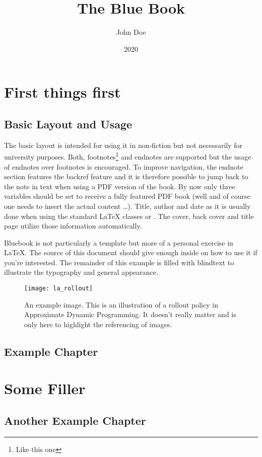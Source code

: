 \documentclass[english]{tex/bluebook}
\title{The Blue Book}
\author{John Doe}
\date{2020}
\begin{document}
	\maketitle	
	\frontmatter
	\tableofcontents

	\mainmatter
	\part{First things first}
	\chapter{Basic Layout and Usage}
	The basic layout is intended for using it in non-fiction but not necessarily for university purposes. 
	Both, footnotes\footnote{Like this one} and endnotes are supported but the usage of endnotes over footnotes is encouraged. To improve navigation, the endnote section features the backref feature and it is therefore possible to jump back to the note in text when using a PDF version of the book. 	 
	By now only three variables should be set to receive a fully featured PDF book (well and of course one needs to insert the actual content \dots). 
	Title, author and date as it is usually done when using the standard \LaTeX{} classes or \KOMAScript{}. The cover, back cover and title page utilize those information automatically. 
	
	Bluebook is not particularly a template but more of a personal exercise in \LaTeX. The source of this document should give enough inside on how to use it if you're interested. The remainder of this example is filled with blindtext to illustrate the typography and general appearance.	
	
	\begin{figure}
		\centering
		\texttt{[image: la\_rollout]}
		\caption{An example image. This is an illustration of a rollout policy in Approximate Dynamic Programming. It doesn't really matter and is only here to highlight the referencing of images.}
		\label{fig:la_rollout}
	\end{figure}	

	\chapter{Example Chapter}
	\blindtext[25]
	
	\part{Some Filler}
	\chapter{Another Example Chapter}
	\blindtext[28]
	
	\cleardoublepage
	\printendnotes	
	\printindex
	\cleardoubleemptypage
\end{document}
